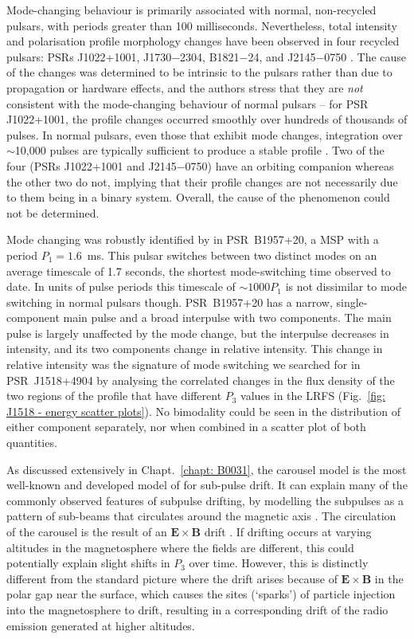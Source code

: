 Mode-changing behaviour is primarily associated with normal, non-recycled pulsars, with periods greater than 100 milliseconds. Nevertheless, total intensity and polarisation profile morphology changes have been observed in four recycled pulsars: PSRs J1022+1001, J1730$-$2304, B1821$-$24, and J2145$-$0750 \citep{KXC+1999}. The cause of the changes was determined to be intrinsic to the pulsars rather than due to propagation or hardware effects, and the authors stress that they are \textit{not} consistent with the mode-changing behaviour of normal pulsars -- for PSR J1022+1001, the profile changes occurred smoothly over hundreds of thousands of pulses. In normal pulsars, even those that exhibit mode changes, integration over $\sim$10,000 pulses are typically sufficient to produce a stable profile \citep{HMTx1975, RRxx1995}. Two of the four (PSRs J1022+1001 and J2145$-$0750) have an orbiting companion whereas the other two do not, implying that their profile changes are not necessarily due to them being in a binary system. Overall, the cause of the phenomenon could not be determined. 

Mode changing was robustly identified by \citet{MKMP2018} in PSR~B1957+20, a MSP with a period $P_1=1.6$~ms. This pulsar switches between two distinct modes on an average timescale of 1.7 seconds, the shortest mode-switching time observed to date. In units of pulse periods this timescale of $\sim 1000 P_1$ is not dissimilar to mode switching in normal pulsars though. PSR~B1957+20 has a narrow, single-component main pulse and a broad interpulse with two components. The main pulse is largely unaffected by the mode change, but the interpulse decreases in intensity, and its two components change in relative intensity. This change in relative intensity was the signature of mode switching we searched for in PSR~J1518+4904 by analysing the correlated changes in the flux density of the two regions of the profile that have different $P_3$ values in the LRFS (Fig.~\ref{fig: J1518 - energy scatter plots}). No bimodality could be seen in the distribution of either component separately, nor when combined in a scatter plot of both quantities.

As discussed extensively in Chapt.~\ref{chapt: B0031}, the carousel model is the most well-known and developed model of for sub-pulse drift. It can explain many of the commonly observed features of subpulse drifting, by modelling the subpulses as a pattern of sub-beams that circulates around the magnetic axis \citep[e.g.][]{RSxx1975, DRxx1999, GSxx2000, GMGx2003}. The circulation of the carousel is the result of an $\mathbf{E} \times \mathbf{B}$ drift \citep{RSxx1975}. If drifting occurs at varying altitudes in the magnetosphere where the fields are different, this could potentially explain slight shifts in $P_3$ over time. However, this is distinctly different from the standard picture where the drift arises because of $\mathbf{E} \times \mathbf{B}$ in the polar gap near the surface, which causes the sites (`sparks') of particle injection into the magnetosphere to drift, resulting in a corresponding drift of the radio emission generated at higher altitudes. %


